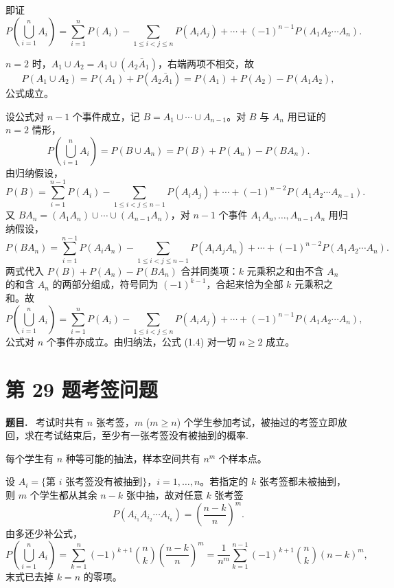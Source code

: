 \documentclass{article}
\newenvironment{problem}{\par\medskip\noindent\textbf{题目.}\ }{\par\smallskip}
\begin{document}
\begin{solution}
  即证
  \[
    P\left(\bigcup_{i=1}^n A_i\right)
    = \sum_{i=1}^n P(A_i) - \sum_{1\le i<j\le n} P(A_iA_j) + \cdots
    + (-1)^{n-1} P(A_1A_2\cdots A_n) .
  \]

  $n=2$ 时，$A_1\cup A_2 = A_1\cup(A_2\bar A_1)$，右端两项不相交，故
  \[
    P(A_1\cup A_2) = P(A_1) + P(A_2\bar A_1)
    = P(A_1) + P(A_2) - P(A_1A_2),
  \]
  公式成立。

  设公式对 $n-1$ 个事件成立，记 $B=A_1\cup\cdots\cup A_{n-1}$。对 $B$ 与 $A_n$ 用已证的 $n=2$ 情形，
  \[
    P\left(\bigcup_{i=1}^n A_i\right) = P(B\cup A_n)
    = P(B) + P(A_n) - P(BA_n) .
  \]
  由归纳假设，
  \[
    P(B) = \sum_{i=1}^{n-1} P(A_i) - \sum_{1\le i<j\le n-1} P(A_iA_j)
    + \cdots + (-1)^{n-2} P(A_1A_2\cdots A_{n-1}) .
  \]
  又 $BA_n = (A_1A_n)\cup\cdots\cup(A_{n-1}A_n)$，对 $n-1$ 个事件 $A_1A_n,\dots,A_{n-1}A_n$ 用归纳假设，
  \[
    P(BA_n) = \sum_{i=1}^{n-1} P(A_iA_n)
    - \sum_{1\le i<j\le n-1} P(A_iA_jA_n) + \cdots
    + (-1)^{n-2} P(A_1A_2\cdots A_n) .
  \]
  两式代入 $P(B)+P(A_n)-P(BA_n)$ 合并同类项：$k$ 元乘积之和由不含 $A_n$ 的和含 $A_n$ 的两部分组成，符号同为
  $(-1)^{k-1}$，合起来恰为全部 $k$ 元乘积之和。故
  \[
    P\left(\bigcup_{i=1}^n A_i\right)
    = \sum_{i=1}^n P(A_i) - \sum_{1\le i<j\le n} P(A_iA_j) + \cdots
    + (-1)^{n-1} P(A_1A_2\cdots A_n),
  \]
  公式对 $n$ 个事件亦成立。由归纳法，公式 (1.4) 对一切 $n\ge2$ 成立。
\end{solution}

\section*{第 29 题\quad 考签问题}

\begin{problem}
  考试时共有 $n$ 张考签，$m$ ($m\ge n$) 个学生参加考试，被抽过的考签立即放回，求在考试结束后，至少有一张考签没有被抽到的概率.
\end{problem}

\begin{solution}
  每个学生有 $n$ 种等可能的抽法，样本空间共有 $n^m$ 个样本点。

  设 $A_i=\{$第 $i$ 张考签没有被抽到$\}$，$i=1,\dots,n$。若指定的 $k$ 张考签都未被抽到，则 $m$
  个学生都从其余 $n-k$ 张中抽，故对任意 $k$ 张考签
  \[
    P(A_{i_1}A_{i_2}\cdots A_{i_k}) = \left(\frac{n-k}{n}\right)^m .
  \]
  由多还少补公式，
  \[
    P\left(\bigcup_{i=1}^n A_i\right)
    = \sum_{k=1}^n (-1)^{k+1}\binom nk\left(\frac{n-k}{n}\right)^m
    = \frac{1}{n^m}\sum_{k=1}^{n-1}(-1)^{k+1}\binom nk(n-k)^m ,
  \]
  末式已去掉 $k=n$ 的零项。
\end{solution}
\end{document}
